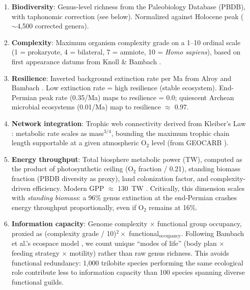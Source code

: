 \documentclass[10pt,letterpaper]{article}
\begin{document}
\begin{enumerate}
\item \textbf{Biodiversity}: Genus-level richness from the Paleobiology Database
      (PBDB), with taphonomic correction (see below). Normalized against Holocene
      peak ($\sim$4,500 corrected genera).

\item \textbf{Complexity}: Maximum organism complexity grade on a 1--10 ordinal
      scale (1 = prokaryote, 4 = bilateral, 7 = amniote, 10 = \emph{Homo sapiens}),
      based on first appearance datums from Knoll \& Bambach \cite{knoll2000}.

\item \textbf{Resilience}: Inverted background extinction rate per Ma from
      Alroy \cite{alroy2008} and Bambach \cite{bambach2006}. Low extinction rate
      = high resilience (stable ecosystem). End-Permian peak rate (0.35/Ma)
      maps to resilience = 0.0; quiescent Archean microbial ecosystems
      (0.01/Ma) map to resilience $\approx$ 0.97.

\item \textbf{Network integration}: Trophic web connectivity derived from
      Kleiber's Law \cite{kleiber1932, west1997}: metabolic rate scales as
      mass$^{3/4}$, bounding the maximum trophic chain length supportable at a
      given atmospheric $\text{O}_2$ level (from GEOCARB \cite{berner2009}).

\item \textbf{Energy throughput}: Total biosphere metabolic power (TW),
      computed as the product of photosynthetic ceiling ($\text{O}_2$ fraction /
      0.21), standing biomass fraction (PBDB diversity as proxy), land
      colonization factor, and complexity-driven efficiency. Modern GPP $\approx$
      130~TW \cite{baron2018}. Critically, this dimension scales with
      \emph{standing biomass}: a 96\% genus extinction at the end-Permian
      crashes energy throughput proportionally, even if $\text{O}_2$ remains at
      16\%.

\item \textbf{Information capacity}: Genome complexity $\times$ functional group
      occupancy, proxied as (complexity grade / 10)$^2 \times$
      functional$_\text{occupancy}$. Following Bambach et al.'s ecospace model
      \cite{bambach2007}, we count unique ``modes of life'' (body plan $\times$
      feeding strategy $\times$ motility) rather than raw genus richness. This
      avoids functional redundancy: 1,000 trilobite species performing the same
      ecological role contribute less to information capacity than 100 species
      spanning diverse functional guilds.
\end{enumerate}
\end{document}
